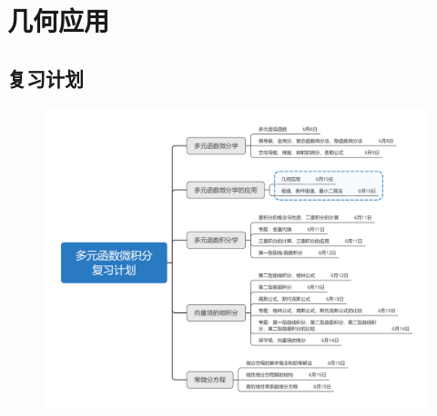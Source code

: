 \documentclass[12pt,UTF8]{ctexart}
\begin{document}
\setcounter{section}{3}
\section{几何应用}
\noindent
\subsection{复习计划}
\begin{figure}[H]
\begin{center}
\includegraphics[height=0.5\textheight]{Figures20190610/plan.png}
\end{center}
\end{figure}
\end{document}
